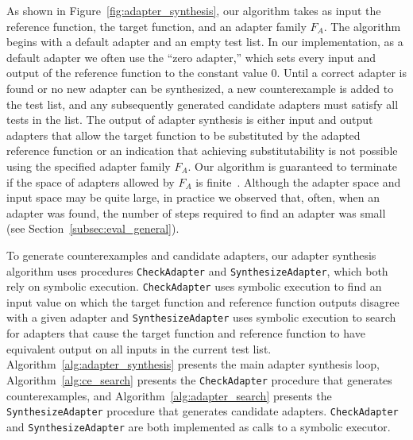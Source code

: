 %
As shown in Figure~\ref{fig:adapter_synthesis}, our algorithm takes as input the reference function, the target function, and an adapter family $F_A$. 
%
The algorithm begins with a default adapter and an empty test list.
%
In our implementation, as a default adapter we often use the ``zero adapter,'' which sets every input and output of the reference function to the constant value 0.
%
Until a correct adapter is found or no new adapter can be synthesized, a new counterexample is added to the test list, and any subsequently generated candidate adapters must satisfy all tests in the list.
%
The output of adapter synthesis is either input and output adapters that allow the target function to be substituted by the adapted reference function or an indication that achieving substitutability is not possible using the specified adapter family $F_A$.
%
Our algorithm is guaranteed to terminate if the space of adapters allowed by $F_A$ is finite~\cite{Solar-LezamaTBSS2006}.
%
Although the adapter space and input space may be quite large, in practice we observed that, often, when an adapter was found, the number of steps required to find an adapter was small (see Section~\ref{subsec:eval_general}).

To generate counterexamples and candidate adapters, our adapter synthesis algorithm uses procedures \texttt{CheckAdapter}
and \texttt{SynthesizeAdapter}, which both rely on symbolic execution.
%
\texttt{CheckAdapter} uses symbolic execution to find an input value on which the target function and reference
function outputs disagree with a given adapter and \texttt{SynthesizeAdapter} uses symbolic execution to search for
adapters that cause the target function and reference function to have equivalent output on all inputs in the current test list.
%
Algorithm~\ref{alg:adapter_synthesis} presents the main adapter synthesis loop, Algorithm~\ref{alg:ce_search} presents
the \texttt{CheckAdapter} procedure that generates counterexamples, and Algorithm~\ref{alg:adapter_search} presents
the \texttt{SynthesizeAdapter} procedure that generates candidate adapters.
%
\texttt{CheckAdapter} and \texttt{SynthesizeAdapter} are both implemented as calls to a symbolic executor.
%

%

